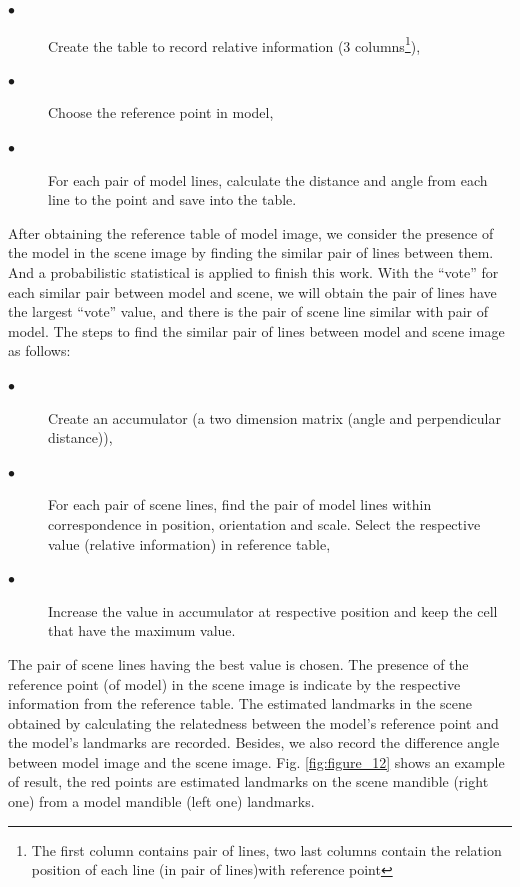 \documentclass[twoside,twocolumn,10pt]{article}
\begin{document}
{\small{
	\begin{description}
		\item[$\bullet$] Create the table to record relative information (3 columns\footnote{The first column contains pair of lines, two last columns contain the relation position of each line (in pair of lines)with reference point}),
		\item[$\bullet$] Choose the reference point in model,
		\item[$\bullet$] For each pair of model lines, calculate the distance and angle from each line to the point and save into the table.
	\end{description}
}}
After obtaining the reference table of model image, we consider the presence of the model in the scene image by finding the similar pair of lines between them. And a probabilistic statistical is applied to finish this work. With the ``vote'' for each similar pair between model and scene, we will obtain the pair of lines have the largest ``vote'' value, and there is the pair of scene line similar with pair of model. The steps to find the similar pair of lines between model and scene image as follows:
{\small{
\begin{description}
	\item[$\bullet$] Create an accumulator (a two dimension matrix (angle and perpendicular distance)),
	\item[$\bullet$] For each pair of scene lines, find the pair of model lines within correspondence in position, orientation and scale. Select the respective value (relative information) in reference table,
	\item[$\bullet$] Increase the value in accumulator at respective position and keep the cell that have the maximum value.
\end{description}
}}
The pair of scene lines having the best value is chosen. The presence of the reference point (of model) in the scene\cite{ashbrook1995robust} image is indicate by the respective information from the reference table. The estimated landmarks in the scene obtained by calculating the relatedness between
the model's reference point and the model's landmarks are
recorded. Besides, we also record the difference angle between model
image and the scene image. Fig. \ref{fig:figure_12} shows an example
of result, the red points are estimated landmarks on the scene mandible
(right one) from a model mandible (left one) landmarks. 
\end{document}
